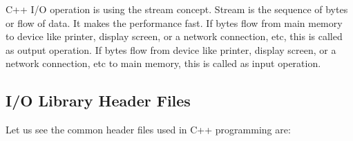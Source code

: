 \documentclass{book}
\begin{document}
C++ I/O operation is using the stream concept. Stream is the sequence of bytes or flow of data. It makes the performance fast. 
If bytes flow from main memory to device like printer, display screen, or a network connection, etc, this is called as output operation. If bytes flow from device like printer, display screen, or a network connection, etc to main memory, this is called as input operation. 

\subsection{I/O Library Header Files}

Let us see the common header files used in C++ programming are:

\end{document}
